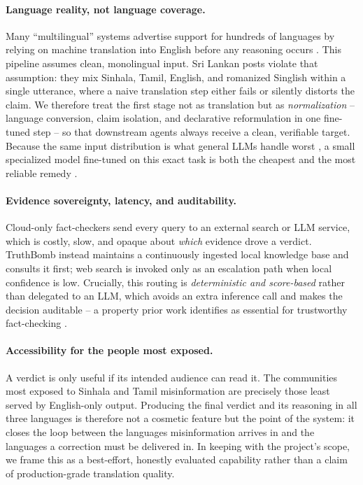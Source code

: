 \documentclass[12pt,a4paper]{article}
\begin{document}
\paragraph{Language reality, not language coverage.}
Many ``multilingual'' systems advertise support for hundreds of languages by
relying on machine translation into English before any reasoning occurs
\cite{bangare}. This pipeline assumes clean, monolingual
input. Sri Lankan posts violate that assumption: they mix Sinhala, Tamil,
English, and romanized Singlish within a single utterance, where a naive
translation step either fails or silently distorts the claim. We therefore
treat the first stage not as translation but as \emph{normalization} --
language conversion, claim isolation, and declarative reformulation in one
fine-tuned step -- so that downstream agents always receive a clean,
verifiable target. Because the same input distribution is what general LLMs
handle worst \cite{vykopal}, a small specialized model
fine-tuned on this exact task is both the cheapest and the most reliable
remedy \cite{factgpt}.
 
\paragraph{Evidence sovereignty, latency, and auditability.}
Cloud-only fact-checkers send every query to an external search or LLM
service, which is costly, slow, and opaque about \emph{which} evidence drove
a verdict. TruthBomb instead maintains a continuously ingested local
knowledge base and consults it first; web search is invoked only as an
escalation path when local confidence is low. Crucially, this routing is
\emph{deterministic and score-based} rather than delegated to an LLM, which
avoids an extra inference call and makes the decision auditable -- a property
prior work identifies as essential for trustworthy fact-checking
\cite{veracity}.
 
\paragraph{Accessibility for the people most exposed.}
A verdict is only useful if its intended audience can read it. The
communities most exposed to Sinhala and Tamil misinformation are precisely
those least served by English-only output. Producing the final verdict and
its reasoning in all three languages is therefore not a cosmetic feature but
the point of the system: it closes the loop between the languages
misinformation arrives in and the languages a correction must be delivered
in. In keeping with the project's scope, we frame this as a best-effort,
honestly evaluated capability rather than a claim of production-grade
translation quality.
\end{document}
